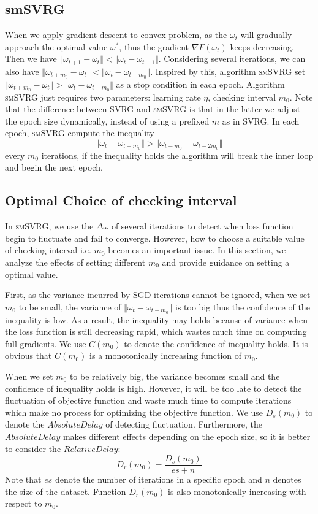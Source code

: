 \documentclass[conference]{IEEEtran}
\begin{document}
 \subsection{smSVRG}
 When we apply gradient descent to convex problem, as the $\omega_t$ will gradually approach the optimal value $\omega^*$, thus the gradient $\nabla F(\omega_t)$ keeps decreasing. Then we have $\Vert\omega_{t+1}-\omega_t\Vert<\Vert\omega_{t}-\omega_{t-1}\Vert$. Considering several iterations, we can also have $\Vert\omega_{t+m_0}-\omega_t\Vert<\Vert\omega_{t}-\omega_{t-m_0}\Vert$. Inspired by this, algorithm \textsc{smSVRG}  set $\Vert\omega_{t+m_0}-\omega_t\Vert>\Vert\omega_{t}-\omega_{t-m_0}\Vert$ as a stop condition in each epoch. 
 Algorithm \textsc{smSVRG} just requires two parameters: learning rate $\eta$, checking interval $m_0$. Note that the difference between SVRG and \textsc{smSVRG} is that in the latter we adjust the epoch size dynamically, instead of using a prefixed $m$ as in SVRG. In each epoch, \textsc{smSVRG} compute the inequality $$\Vert\omega_{t}-\omega_{t-m_0}\Vert>\Vert\omega_{t-m_0}-\omega_{t-2m_0}\Vert$$ every $m_0$ iterations, if the inequality holds the algorithm will break the inner loop and begin the next epoch.
 
 \subsection{Optimal Choice of checking interval}
 \label{secOCCI}
 In \textsc{smSVRG}, we use the $\Delta\omega$ of several iterations to detect when loss function begin to fluctuate and fail to converge. However, how to choose a suitable value of checking interval i.e. $m_0$ becomes an important issue. In this section, we analyze the effects of setting different $m_0$ and provide guidance on setting a optimal value.
 
 First, as the variance incurred by SGD iterations cannot be ignored, when we set $m_0$ to be small, the variance of $\Vert\omega_{t}-\omega_{t-m_0}\Vert$ is too big thus the confidence of the inequality is low. As a result, the inequality may holds because of variance when the loss function is still decreasing rapid, which wastes much time on computing full gradients. We use $C(m_0)$ to denote the confidence of inequality holds. It is obvious that $C(m_0)$ is a monotonically increasing function of $m_0$.
 
 When we set $m_0$ to be relatively big, the variance becomes small and the confidence of inequality holds is high. However, it will be too late to detect the fluctuation of objective function and waste much time to compute iterations which make no process for optimizing the objective function. We use $D_s(m_0)$ to denote the $Absolute Delay$ of detecting fluctuation. Furthermore, the $Absolute Delay$ makes different effects depending on the epoch size, so it is better to consider the $Relative Delay$:
 $$D_r(m_0)=\frac{D_s(m_0)}{es+n}$$
 Note that $es$ denote the number of iterations in a specific epoch and $n$ denotes the size of the dataset. Function $D_r(m_0)$ is also monotonically increasing with respect to $m_0$.
\end{document}
